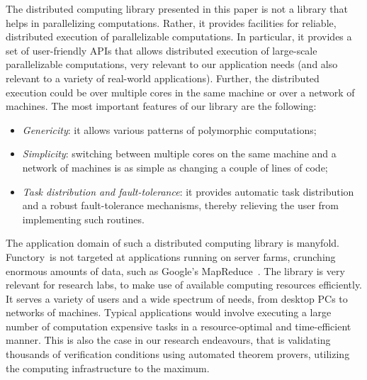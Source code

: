 \documentclass{llncs}
\newcommand{\functory}{\textsf{Functory}}
\begin{document}
The distributed computing library presented in this paper is not a
library that helps in parallelizing computations. Rather, it provides
facilities for reliable, distributed execution of parallelizable
computations. In particular, it provides a set of user-friendly APIs
that allows distributed execution of large-scale parallelizable
computations, very relevant to our application needs (and also
relevant to a variety of real-world applications). Further, the
distributed execution could be over multiple cores in the same machine
or over a network of machines. The most important features of our
library are the following:
\begin{itemize}
\item \emph{Genericity}: 
  it allows various patterns of polymorphic computations;
\item \emph{Simplicity}: switching between multiple cores on the same
  machine and a network of machines is as simple as changing a couple
  of lines of code;
\item \emph{Task distribution and fault-tolerance}: 
  it provides automatic task distribution and
  a robust fault-tolerance mechanisms, thereby
  relieving the user from implementing such routines.
\end{itemize}
The application domain of such a distributed computing library is manyfold. 
\functory\ is not targeted at applications running on server farms,
crunching enormous amounts of data, such as Google's
MapReduce~\cite{mapreduce}.  The library is very relevant for
research labs, to make use of available computing resources
efficiently. It serves a variety of users and a wide spectrum of
needs, from desktop PCs to networks of machines.  Typical applications
would involve executing a large number of computation expensive tasks
in a resource-optimal and time-efficient manner. This is also the case
in our research endeavours, that is validating thousands of
verification conditions using automated theorem provers, utilizing the
computing infrastructure to the maximum.
\end{document}
